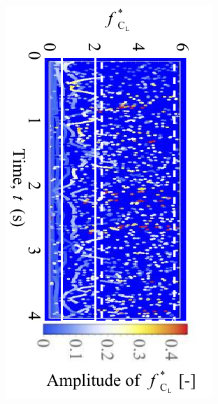 \documentclass[oneside]{utmthesis}
\begin{document}
\begin{figure}[H]
\begin{subfigure}[h]{0.49\textwidth}
    \includegraphics[angle=90,width=\textwidth]{figs/instantLiftFreq-d}
    \caption{}
    \label{fig:instantLiftFreq-d}
  \end{subfigure}
  \hfill
  \begin{subfigure}[h]{0.49\textwidth}

\end{subfigure}
\end{figure}
\end{document}
